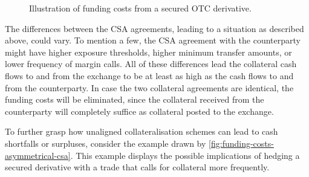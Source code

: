 \documentclass[main.tex]{subfiles}
\begin{document}
        \begin{figure}
            \centering
            \resizebox{\textwidth}{!}{%
            \begin{tikzpicture}
                
            \end{tikzpicture}        
            }   
            \caption{Illustration of funding costs from a secured OTC derivative.}
            \label{fig:funding-costs-secured-derivative}
        \end{figure}

        The differences between the CSA agreements, leading to a situation as described above, could vary. 
        To mention a few, the CSA agreement with the counterparty might have higher exposure thresholds, 
        higher minimum transfer amounts, or lower frequency of margin calls.
        All of these differences lead the collateral cash flows to and from the exchange 
        to be at least as high as the cash flows to and from the counterparty. 
        In case the two collateral agreements are identical, the funding costs will be eliminated, 
        since the collateral received from the counterparty will completely suffice as collateral posted to the exchange.        

        To further grasp how unaligned collateralisation schemes can lead to cash shortfalls or surpluses, 
        consider the example drawn by \cref{fig:funding-costs-asymmetrical-csa}.
        This example displays the possible implications of hedging a secured derivative
        with a trade that calls for collateral more frequently.
\end{document}
